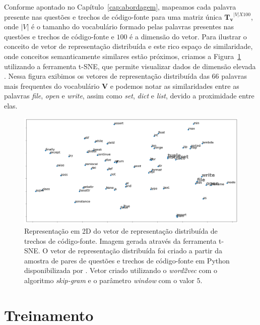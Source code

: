 Conforme apontado no Capítulo~\ref{cap:abordagem}, mapeamos cada palavra presente nas questões e trechos de código-fonte para uma matriz única $\bm{T_{v}}^{|V| X 100}$, onde $|V|$ é o tamanho do vocabulário formado pelas palavras presentes nas questões e trechos de código-fonte e $100$ é a dimensão do vetor. Para ilustrar o conceito de vetor de representação distribuída e este rico espaço de similaridade, onde conceitos semanticamente similares estão próximos, criamos a Figura~\ref{fig:tsne-code-snippet-python} utilizando a ferramenta t-SNE, que permite visualizar dados de dimensão elevada \citep{scikit-learn-tsne-2019, quora-tsne-2019}. Nessa figura exibimos os vetores de representação distribuída das 66 palavras mais frequentes do vocabulário $\bm{V}$ e podemos notar as similaridades entre as palavras \emph{file}, \emph{open}  e \emph{write}, assim como \emph{set}, \emph{dict} e \emph{list}, devido a proximidade entre elas.

\begin{figure}[H]
\includegraphics[width=1\textwidth]{figuras/cap-experimento/code_tsne.png}
\caption{Representação em 2D do vetor de representação distribuída de trechos de código-fonte. Imagem gerada através da ferramenta t-SNE. O vetor de representação distribuída foi criado a partir da amostra de pares de questões e trechos de código-fonte em Python disponibilizada por \cite{yao-2018}. Vetor criado utilizando o \textit{word2vec} com o algoritmo \textit{skip-gram} e o parâmetro \textit{window} com o valor $5$.}
\label{fig:tsne-code-snippet-python}
\end{figure}

\section{Treinamento}
\label{sec:treinamento}


